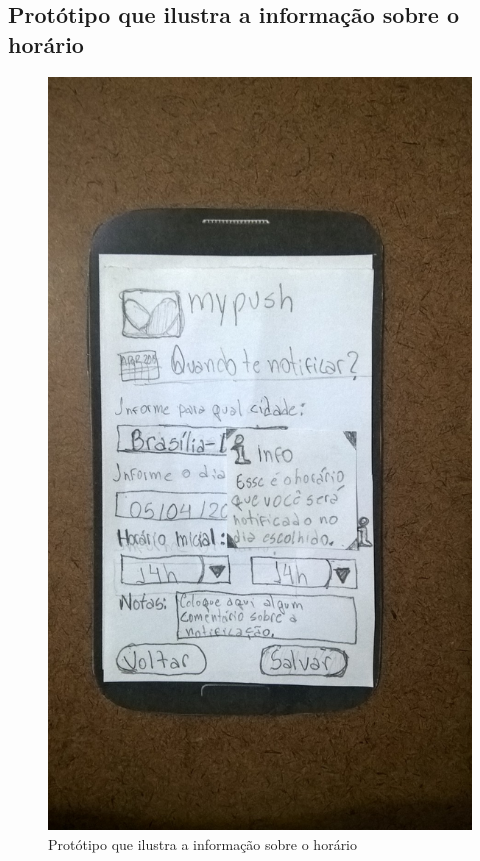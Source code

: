 \begin{anexosenv}
  \pagebreak
  \section*{Protótipo que ilustra a informação sobre o horário}

    \begin{figure}[!htbp]
      \centering
      \includegraphics[scale=0.32, angle=-90]{editaveis/figuras/prototipo_papel_v2/quando_notificar_info_horario}
      \caption{Protótipo que ilustra a informação sobre o horário}
      \label{quando_notificar_info_horario_v2}
    \end{figure}
    

\end{anexosenv}
